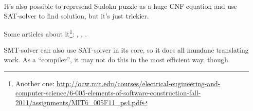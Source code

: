 It's also possible to represend Sudoku puzzle as a huge \ac{CNF} equation and use SAT-solver to find solution, but it's just trickier.

Some articles about it\footnote{Another one: \url{http://ocw.mit.edu/courses/electrical-engineering-and-computer-science/6-005-elements-of-software-construction-fall-2011/assignments/MIT6_005F11_ps4.pdf}}: \cite{Sudoku1}, \cite{Sudoku2}, \cite{Sudoku3}.

SMT-solver can also use SAT-solver in its core, so it does all mundane translating work.
As a ``compiler'', it may not do this in the most efficient way, though.

